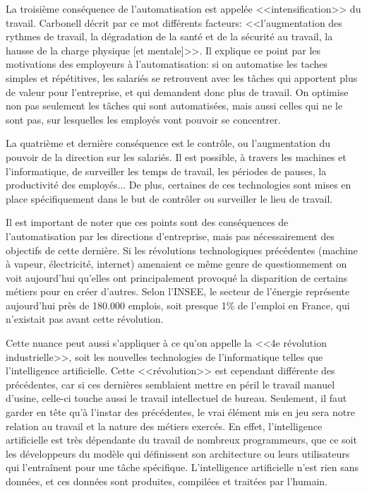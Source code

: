 \documentclass[openany, 11pt]{memoir}
\begin{document}
\bigskip
La troisième conséquence de l'automatisation est appelée <<intensification>> du travail. Carbonell décrit par ce mot différents facteurs: <<l'augmentation des rythmes de travail, la dégradation de la santé et de la sécurité au travail, la hausse de la charge physique [et mentale]>>. Il explique ce point par les motivations des employeurs à l'automatisation: si on automatise les taches simples et répétitives, les salariés se retrouvent avec les tâches qui apportent plus de valeur pour l'entreprise, et qui demandent donc plus de travail. On optimise non pas seulement les tâches qui sont automatisées, mais aussi celles qui ne le sont pas, sur lesquelles les employés vont pouvoir se concentrer.

\bigskip
La quatrième et dernière conséquence est le contrôle, ou l'augmentation du pouvoir de la direction sur les salariés. Il est possible, à travers les machines et l'informatique, de surveiller les temps de travail, les périodes de pauses, la productivité des employés... De plus, certaines de ces technologies sont mises en place spécifiquement dans le but de contrôler ou surveiller le lieu de travail.

\bigskip
Il est important de noter que ces points sont des conséquences de l'automatisation par les directions d'entreprise, mais pas nécessairement des objectifs de cette dernière. Si les révolutions technologiques précédentes (machine à vapeur, électricité, internet) amenaient ce même genre de questionnement on voit aujourd'hui qu'elles ont principalement provoqué la disparition de certains métiers pour en créer d'autres. Selon l'INSEE, le secteur de l'énergie représente aujourd'hui près de 180.000 emplois, soit presque 1\% de l'emploi en France, qui n'existait pas avant cette révolution. 

Cette nuance peut aussi s'appliquer à ce qu'on appelle la <<4e révolution industrielle>>, soit les nouvelles technologies de l'informatique telles que l'intelligence artificielle. Cette <<révolution>> est cependant différente des précédentes, car si ces dernières semblaient mettre en péril le travail manuel d'usine, celle-ci touche aussi le travail intellectuel de bureau. Seulement, il faut garder en tête qu'à l'instar des précédentes, le vrai élément mis en jeu sera notre relation au travail et la nature des métiers exercés. En effet, l'intelligence artificielle est très dépendante du travail de nombreux programmeurs, que ce soit les développeurs du modèle qui définissent son architecture ou leurs utilisateurs qui l'entraînent pour une tâche spécifique. L'intelligence artificielle n'est rien sans données, et ces données sont produites, compilées et traitées par l'humain.
\end{document}
